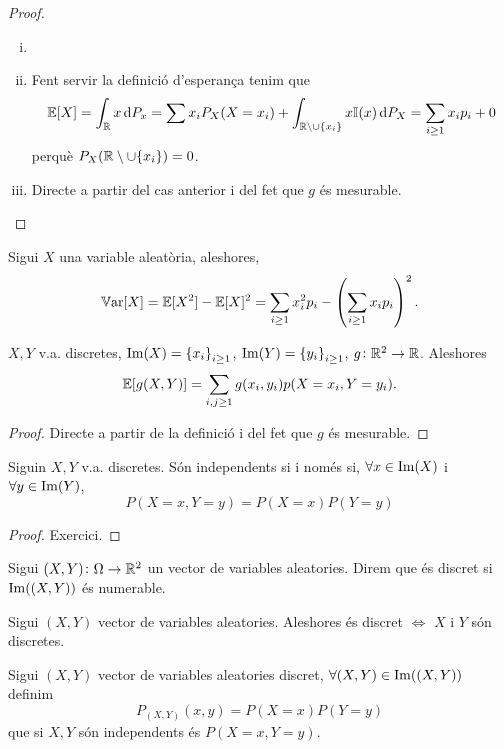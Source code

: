 \begin{proof}
    \begin{enumerate}[i)]
        \item[]
        \item Fent servir la definició d'esperança tenim que
	  \[ \esp[X] = \int_{\real}{x\dif P_x} = \sum{x_i P_X(X=x_i) + \int_{\real\setminus\cup\{x_i\}}{x\mathbb{I}(x) \dif P_X}} = \sum_{i \ge 1}{x_i p_i} + 0\]
            perquè $P_X(\mathbb{R}\setminus\cup\{x_i\}) = 0$.
        \item Directe a partir del cas anterior i del fet que $g$ és mesurable.
    \end{enumerate}
\end{proof}

\begin{obs}
    Sigui $X$ una variable aleatòria, aleshores,
    \[\operatorname{\mathbb{V}ar}[X] = \operatorname{\mathbb{E}}[X^2] - \operatorname{\mathbb{E}}[X]^2 = \sum_{i \ge 1}{x_i^2 p_i} - \left(\sum_{i \ge 1}{x_i p_i}\right)^2.\]
\end{obs}

\begin{prop}
    $X, Y$ v.a. discretes, $\operatorname{Im}(X) = \left\{ x_i \right\}_{i \ge 1}$, $\operatorname{Im}(Y) = \left\{ y_i \right\}_{i \ge 1}$, $g\colon \mathbb{R}^2\to\mathbb{R}$. Aleshores
    \[\operatorname{\mathbb{E}}[g(X,Y)] = \sum_{i,j \ge 1}{g(x_i,y_i) p(X=x_i, Y=y_i)}.\]
\end{prop}
\begin{proof}
    Directe a partir de la definició i del fet que $g$ és mesurable.
\end{proof}


\begin{prop}
    Siguin $X,Y$ v.a. discretes. Són independents si i només si, $\forall x \in\operatorname{Im}(X)$ i $\forall y \in\operatorname{Im}(Y)$,
    \[P(X=x, Y=y) = P(X=x)P(Y=y)\]
\end{prop}
\begin{proof}
    Exercici.
\end{proof}


\begin{defi}
    Sigui $(X,Y)\colon \Omega\to\mathbb{R}^2$ un vector de variables aleatories. Direm que és discret si $\operatorname{Im}((X,Y))$ és numerable.
\end{defi}

\begin{obs}
    Sigui $(X,Y)$ vector de variables aleatories. Aleshores és discret $\iff$ $X$ i $Y$ són discretes.
\end{obs}

\begin{defi}
    Sigui $(X,Y)$ vector de variables aleatories discret, $\forall(X,Y) \in \operatorname{Im}((X,Y))$ definim
    \[P_{(X,Y)}(x,y) = P(X=x)P(Y=y)\]
    que si $X,Y$ són independents és $P(X=x,Y=y)$.
\end{defi}


